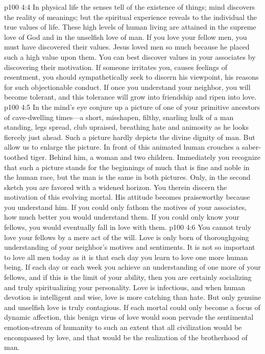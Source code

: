 \pc \vs p100 4:4 In physical life the senses tell of the existence of things; mind discovers the reality of meanings; but the spiritual experience reveals to the individual the true values of life. These high levels of human living are attained in the supreme love of God and in the unselfish love of man. If you love your fellow men, you must have discovered their values. Jesus loved men so much because he placed such a high value upon them. You can best discover values in your associates by discovering their motivation. If someone irritates you, causes feelings of resentment, you should sympathetically seek to discern his viewpoint, his reasons for such objectionable conduct. If once you understand your neighbor, you will become tolerant, and this tolerance will grow into friendship and ripen into love.
\vs p100 4:5 In the mind’s eye conjure up a picture of one of your primitive ancestors of cave\hyp{}dwelling times---a short, misshapen, filthy, snarling hulk of a man standing, legs spread, club upraised, breathing hate and animosity as he looks fiercely just ahead. Such a picture hardly depicts the divine dignity of man. But allow us to enlarge the picture. In front of this animated human crouches a saber\hyp{}toothed tiger. Behind him, a woman and two children. Immediately you recognize that such a picture stands for the beginnings of much that is fine and noble in the human race, but the man is the same in both pictures. Only, in the second sketch you are favored with a widened horizon. You therein discern the motivation of this evolving mortal. His attitude becomes praiseworthy because you understand him. If you could only fathom the motives of your associates, how much better you would understand them. If you could only know your fellows, you would eventually fall in love with them.\plusone
\vs p100 4:6 You cannot truly love your fellows by a mere act of the will. Love is only born of thoroughgoing understanding of your neighbor’s motives and sentiments. It is not so important to love all men today as it is that each day you learn to love one more human being. If each day or each week you achieve an understanding of one more of your fellows, and if this is the limit of your ability, then you are certainly socializing and truly spiritualizing your personality. Love is infectious, and when human devotion is intelligent and wise, love is more catching than hate. But only genuine and unselfish love is truly contagious. If each mortal could only become a focus of dynamic affection, this benign virus of love would soon pervade the sentimental emotion\hyp{}stream of humanity to such an extent that all civilization would be encompassed by love, and that would be the realization of the brotherhood of man.
